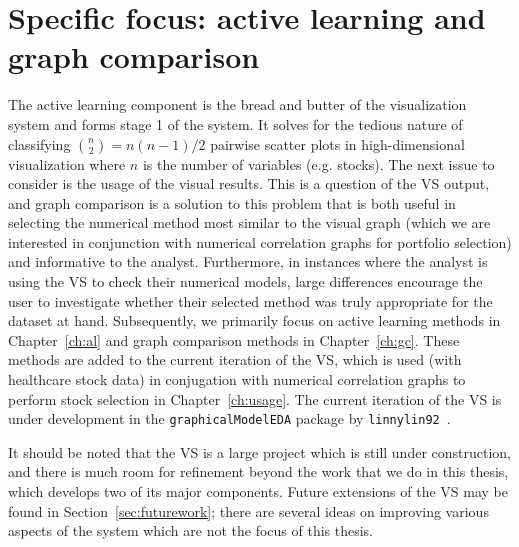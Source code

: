 \section{Specific focus: active learning and graph comparison}
\label{sec:visualizer:focus}

The active learning component is the bread and butter of the visualization 
system and forms stage 1 of the system. It solves for the 
tedious nature of classifying ${n \choose 2}=n(n-1)/2$ pairwise scatter plots 
in high-dimensional visualization where $n$ is the number of variables (e.g. 
stocks). 
The next issue to consider is the usage of the visual results. This is a 
question of the VS output, and graph comparison is a solution to this problem 
that is both useful in selecting the numerical method most similar to the 
visual graph (which we are interested in conjunction with numerical correlation 
graphs for portfolio selection) and informative to the analyst. Furthermore, in 
instances where the analyst is using the VS to check their numerical models, 
large differences encourage the user to investigate whether their selected 
method was truly appropriate for the dataset at hand. 
Subsequently, 
we primarily focus on active learning methods in Chapter~\ref{ch:al} and graph 
comparison methods in Chapter~\ref{ch:gc}. These methods are added to the 
current iteration of the VS, which is used (with healthcare stock data) 
in conjugation with numerical correlation graphs to perform stock selection in 
Chapter~\ref{ch:usage}. The current iteration of the VS is under development in 
the \texttt{graphicalModelEDA} package by \texttt{linnylin92}~\cite{lin2017}.

It should be noted that the VS is a large project which is still under 
construction, and there is much room for 
refinement beyond the work that we do in this thesis, which develops two of its 
major components. Future extensions of the VS may be found in 
Section~\ref{sec:futurework}; there are several ideas on improving various 
aspects of the system which are not the focus of this thesis.